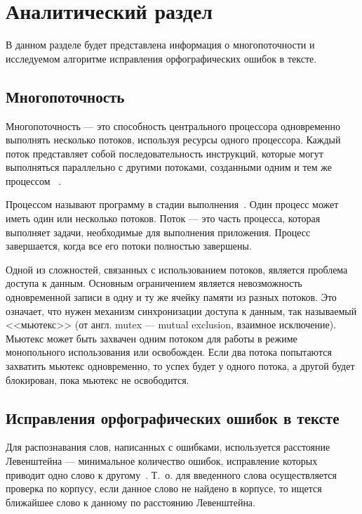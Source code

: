\chapter{Аналитический раздел}

В данном разделе будет представлена информация о многопоточности и исследуемом алгоритме исправления орфографических ошибок в тексте.

\section{Многопоточность} 

Многопоточность --- это способность центрального процессора одновременно выполнять несколько потоков, используя ресурсы одного процессора. Каждый поток представляет собой последовательность инструкций, которые могут выполняться параллельно с другими потоками, созданными одним и тем же процессом~\cite{multithreading} .

Процессом называют программу в стадии выполнения~\cite{process}. Один процесс может иметь один или несколько потоков. Поток --- это часть процесса, которая выполняет задачи, необходимые для выполнения приложения. Процесс завершается, когда все его потоки полностью завершены. 

Одной из сложностей, связанных с использованием потоков, является проблема доступа к данным. 
Основным ограничением является невозможность одновременной записи в одну и ту же ячейку памяти из разных потоков.
Это означает, что нужен механизм синхронизации доступа к данным, так называемый <<мьютекс>> (от англ. mutex --- mutual exclusion, взаимное исключение). 
Мьютекс может быть захвачен одним потоком для работы в режиме монопольного использования или освобожден. Если два потока попытаются захватить мьютекс одновременно, то успех будет у одного потока, а другой будет блокирован, пока мьютекс не освободится.

\section{Исправления орфографических ошибок в тексте}

Для распознавания слов, написанных с ошибками, используется расстояние
Левенштейна --- минимальное количество ошибок, исправление которых приводит
одно слово к другому~\cite{miem}. 
Т.~о. для введенного слова осуществляется проверка по корпусу, если данное слово не найдено в корпусе, то ищется ближайшее слово к данному по расстоянию Левенштейна. 

